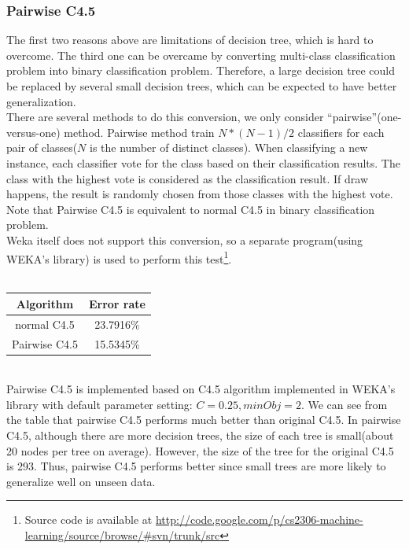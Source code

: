 \documentclass[a4paper,11pt]{article}
\begin{document}
\subsubsection{Pairwise C4.5}
The first two reasons above are limitations of decision tree, which is hard to overcome. The third one can be overcame by converting multi-class classification problem into binary classification problem. Therefore, a large decision tree could be replaced by several small decision trees, which can be expected to have better generalization.\\
There are several methods to do this conversion, we only consider ``pairwise''(one-versus-one) method. Pairwise method train $N*(N-1)/2$ classifiers for each pair of classes($N$ is the number of distinct classes). When classifying a new instance, each classifier vote for the class based on their classification results. The class with the highest vote is considered as the classification result. If draw happens, the result is randomly chosen from those classes with the highest vote. Note that Pairwise C4.5 is equivalent to normal C4.5 in binary classification problem.\\
Weka itself does not support this conversion, so a separate program(using WEKA's library) is used to perform this test\footnote{Source code is available at \url{http://code.google.com/p/cs2306-machine-learning/source/browse/#svn/trunk/src}}.\\
\vspace{0.5cm}\\
\begin{tabular}{c c}
Algorithm	& Error rate\\
\hline \hline
normal C4.5	& 23.7916\%\\
Pairwise C4.5	& 15.5345\%\\
\end{tabular}
\vspace{0.5cm}\\
Pairwise C4.5 is implemented based on C4.5 algorithm implemented in WEKA's library with default parameter setting: $C=0.25,minObj=2$. We can see from the table that pairwise C4.5 performs much better than original C4.5. In pairwise C4.5, although there are more decision trees, the size of each tree is small(about 20 nodes per tree on average). However, the size of the tree for the original C4.5 is 293. Thus, pairwise C4.5 performs better since small trees are more likely to generalize well on unseen data.
\end{document}
